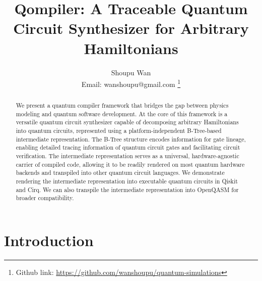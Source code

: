 \documentclass[a4paper,titlepage]{article}
\begin{document}
    \title{Qompiler: A Traceable Quantum Circuit Synthesizer for Arbitrary Hamiltonians}

    \author{Shoupu Wan \\
    Email: wanshoupu@gmail.com \thanks{Github link: \url{https://github.com/wanshoupu/quantum-simulations}}
    }

    \maketitle

    \begin{abstract}
        We present a quantum compiler framework that bridges the gap between physics modeling and quantum software development.
        At the core of this framework is a versatile quantum circuit synthesizer capable of decomposing arbitrary Hamiltonians into quantum circuits,
        represented using a platform-independent B-Tree-based intermediate representation.
        The B-Tree structure encodes information for gate lineage, enabling detailed tracing information of quantum circuit gates and facilitating circuit verification.
        The intermediate representation serves as a universal, hardware-agnostic carrier of compiled code,
        allowing it to be readily rendered on most quantum hardware backends and transpiled into other quantum circuit languages.
        We demonstrate rendering the intermediate representation into executable quantum circuits in Qiskit and Cirq.
        We can also transpile the intermediate representation into OpenQASM for broader compatibility.
    \end{abstract}



    \section{Introduction}\label{sec:introduction}
\end{document}
